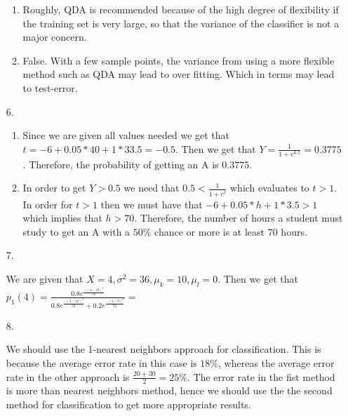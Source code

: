 \documentclass{article}
\begin{document}
\begin{enumerate}
\begin{enumerate}
        \item
        
        Roughly, QDA is recommended because of the high degree of flexibility if the training set is very large, so that the variance of the classifier is not a major concern.
        
        \item
        
        False. With a few sample points, the variance from using a more flexible method such as QDA may lead to over fitting. Which in terms may lead to test-error.
        
    \end{enumerate}
    
    \item [6.]
    
    \begin{enumerate}
        \item 
        
        Since we are given all values needed we get that $t=-6+0.05*40+1*33.5=-0.5$. Then we get that $Y = \frac{1}{1+e^{0.5}} = 0.3775$. Therefore, the probability of getting an A is $0.3775.$
        
        \item
        
        In order to get $Y>0.5$ we need that $0.5<\frac{1}{1+e^t}$ which evaluates to $t>1.$ In order for $t>1$ then we must have that $-6+0.05*h+1*3.5 >1$ which implies that $h>70.$ Therefore, the number of hours a student must study to get an A with a $50\%$ chance or more is at least $70$ hours.
        
    \end{enumerate}
    
    \item [7.]
    
    We are given that $X=4, \sigma^2 = 36, \mu_k = 10, \mu_l = 0$. Then we get that $p_1(4) = \frac{0.8e^{\frac{-(4-10)^2}{72}}}{0.8e^{\frac{-(4-10)^2}{72}}+0.2e^{\frac{-(4-0)^2}{72}}} = $
    
    \item [8.]
    
    We should use the 1-nearest neighbors approach for classification. This is because the average error rate in this case is $18\%$, whereas the average error rate in the other approach is $\frac{20+30}{2} = 25\%$. The error rate in the fist method is more than nearest neighbors method, hence we should use the the second method for classification to get more appropriate results.
    

\end{enumerate}
\end{document}
